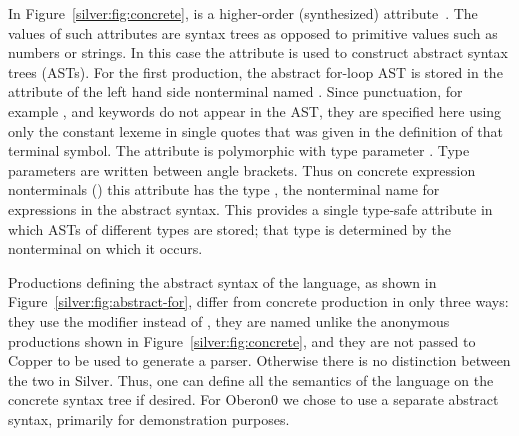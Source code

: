 In Figure~\ref{silver:fig:concrete},  is a higher-order (synthesized)
attribute~\cite{vogt89}.  The values of such attributes are syntax trees as
opposed to primitive values such as numbers or strings.  In this case
the attribute is used to construct abstract syntax trees (ASTs).
%
For the first production, the abstract for-loop AST is stored
in the  attribute of the left hand side nonterminal named
. Since punctuation, for example \code{:=}, and keywords do
not appear in the AST, they are specified here using only the constant
lexeme in single quotes that was given in the definition of that
terminal symbol.
%
The attribute  is polymorphic with type parameter .
Type parameters are written between angle brackets.
%
Thus on concrete expression nonterminals () this
attribute has the type , the nonterminal name for
expressions in the abstract syntax.  This provides a single type-safe
attribute in which ASTs of different types are stored; that type
is determined by the nonterminal on which it occurs.


Productions defining the abstract syntax of the language, as shown in
Figure~\ref{silver:fig:abstract-for}, differ from concrete production
in only three ways: they use the  modifier instead of
, they are named unlike the anonymous productions shown
in Figure~\ref{silver:fig:concrete}, and they are not passed to Copper
to be used to generate a parser.
%
Otherwise there is no distinction
between the two in Silver.  Thus, one can define all the semantics of
the language on the concrete syntax tree if desired.  For Oberon0 we
chose to use a separate abstract syntax, primarily for demonstration
purposes.

